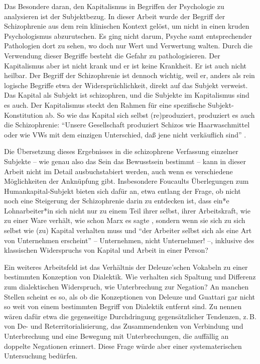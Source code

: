 \documentclass[12pt,
               paper=a4,
               twoside=false,
               onehalfspacing,
               bibliography=totoc,
               toc=graduated,
               ]{scrartcl}
\newcommand{\pc}[2]{\parencite[#1]{#2}}
\newcommand{\vgl}[2]{\parencite[vgl.][#1]{#2}}
\begin{document}
Das Besondere daran, den Kapitalismus in Begriffen der Psychologie zu
analysieren ist der Subjektbezug. In dieser Arbeit wurde der Begriff
der Schizophrenie aus dem rein klinischen Kontext gelöst, um nicht in
einen kruden Psychologismus abzurutschen. Es ging nicht darum, Psyche
samt entsprechender Pathologien dort zu sehen, wo doch nur Wert und
Verwertung walten. Durch die Verwendung dieser Begriffe besteht die
Gefahr zu pathologisieren. Der Kapitalismus aber ist nicht krank und
er ist keine Krankheit. Er ist auch nicht heilbar. Der Begriff der
Schizophrenie ist dennoch wichtig, weil er, anders als rein logische
Begriffe etwa der Widersprüchlichkeit, direkt auf das Subjekt
verweist. Das Kapital als Subjekt ist schizophren, und die Subjekte im
Kapitalismus sind es auch. Der Kapitalismus steckt den Rahmen für eine
spezifische Subjekt-Konstitution ab. So wie das Kapital sich selbst
(re)produziert, produziert es auch die Schizophrenie: "`Unsere
Gesellschaft produziert Schizos wie Haarwaschmittel oder wie VWs mit
dem einzigen Unterschied, daß jene nicht verkäuflich sind"' \pc{S. 315
f.}{ao}.

Die Übersetzung dieses Ergebnisses in die schizophrene Verfassung
einzelner Subjekte -- wie genau also das Sein das Bewusstsein bestimmt
-- kann in dieser Arbeit nicht im Detail ausbuchstabiert werden, auch
wenn es verschiedene Möglichkeiten der Anknüpfung gibt. Insbesondere
Foucaults Überlegungen zum Humankapital-Subjekt bieten sich dafür an,
etwa entlang der Frage, ob nicht noch eine Steigerung der
Schizophrenie darin zu entdecken ist, dass ein*e Lohnarbeiter*in sich
nicht nur zu einem Teil ihrer selbst, ihrer Arbeitskraft, wie zu einer
Ware verhält, wie schon Marx es sagte \vgl{182}{kap}, sondern wenn sie
sich zu sich selbst wie (zu) Kapital verhalten muss und "`der Arbeiter
selbst sich als eine Art von Unternehmen erscheint"' \pc{313}{gbp} --
Unternehmen, nicht Unternehmer! --, inklusive des klassischen
Widerspruchs von Kapital und Arbeit in einer Person?

Ein weiteres Arbeitsfeld ist das Verhältnis der Deleuze'schen Vokabeln
zu einer bestimmten Konzeption von Dialektik. Wie verhalten sich
Spaltung und Differenz zum dialektischen Widerspruch, wie
Unterbrechung zur Negation? An manchen Stellen scheint es so, als ob
die Konzeptionen von Deleuze und Guattari gar nicht so weit von einem
bestimmten Begriff von Dialektik entfernt sind. Zu nennen wären dafür
etwa die gegenseitige Durchdringung gegensätzlicher Tendenzen, z.\,B.
von De- und Reterritorialisierung, das Zusammendenken von Verbindung
und Unterbrechung und eine Bewegung mit Unterbrechungen, die auffällig
an doppelte Negationen erinnert. Diese Frage würde aber einer
systematerischen Untersuchung bedürfen.
\end{document}
